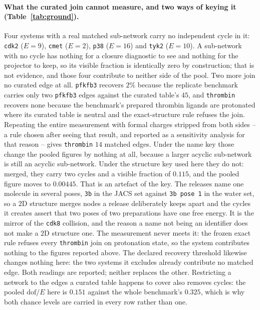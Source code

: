 \paragraph{What the curated join cannot measure, and two ways of keying it
(Table~\ref{tab:ground}).} Four systems with a real matched sub-network carry no independent cycle
in it: \texttt{cdk2} ($E=9$), \texttt{cmet} ($E=2$), \texttt{p38} ($E=16$) and \texttt{tyk2}
($E=10$). A sub-network with no cycle has nothing for a closure diagnostic to see and nothing for
the projector to keep, so its visible fraction is identically zero by construction; that is not
evidence, and those four contribute to neither side of the pool. Two more join no curated edge at
all. \texttt{pfkfb3} recovers $2\%$ because the replicate benchmark carries only two
\texttt{pfkfb3} edges against the curated table's $45$, and \texttt{thrombin} recovers none because
the benchmark's prepared thrombin ligands are protonated where its curated table is neutral and the
exact-structure rule refuses the join. Repeating the entire measurement with formal charges
stripped from both sides -- a rule chosen after seeing that result, and reported as a sensitivity
analysis for that reason -- gives \texttt{thrombin} $14$ matched edges. Under the name key those
change the pooled figures by nothing at all, because a larger acyclic sub-network is still an
acyclic sub-network. Under the structure key used here they do not: merged, they carry two cycles
and a visible fraction of $0.115$, and the pooled figure moves to $0.00445$. That is an artefact
of the key. The releases name one molecule in several poses, \texttt{3b} in the JACS set against
\texttt{3b pose 1} in the water set, so a $2$D structure merges nodes a release deliberately keeps
apart and the cycles it creates assert that two poses of two preparations have one free energy.
It is the mirror of the \texttt{cdk8} collision, and the reason a name not being an identifier
does not make a $2$D structure one. The measurement never meets it: the frozen exact rule refuses
every \texttt{thrombin} join on protonation state, so the system contributes nothing to the
figures reported above.
The declared recovery threshold likewise changes nothing here: the two systems it excludes already
contribute no matched edge. Both readings are reported; neither replaces the other. Restricting a
network to the edges a curated table happens to cover also removes cycles: the pooled
$\mathrm{dof}/E$ here is $0.151$ against the whole benchmark's $0.325$, which is why both chance
levels are carried in every row rather than one.

